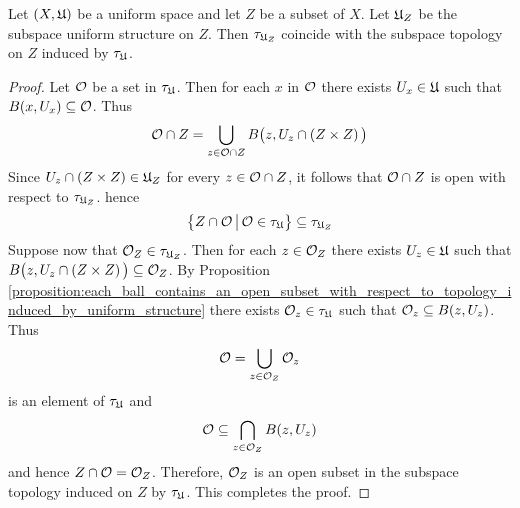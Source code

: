 \begin{proposition}\label{proposition:the_induced_topology_preserves_uniform_subspaces}
Let $(X,{\mathfrak U})$ be a uniform space and let $Z$ be a subset of $X$. Let ${\mathfrak U}_Z$ be the subspace uniform structure on $Z$. Then $\tau_{{\mathfrak U}_Z}$ coincide with the subspace topology on $Z$ induced by $\tau_{{\mathfrak U}}$.
\end{proposition}
\begin{proof}
Let ${\mathcal O}$ be a set in $\tau_{{\mathfrak U}}$. Then for each $x$ in ${\mathcal O}$ there exists $U_x\in {\mathfrak U}$ such that $B(x,U_x)\subseteq {\mathcal O}$. Thus
$${\mathcal O} \cap Z = \bigcup_{z\in {\mathcal O}\cap Z}B\big(z,U_z\cap \left(Z\times Z\right)\big)$$
Since $U_z\cap \left(Z\times Z\right) \in {\mathfrak U}_Z$ for every $z \in {\mathcal O}\cap Z$, it follows that ${\mathcal O}\cap Z$ is open with respect to $\tau_{{\mathfrak U}_Z}$. hence
$$\big\{Z\cap {\mathcal O}\,\big|\,{\mathcal O} \in \tau_{{\mathfrak U}}\big\} \subseteq \tau_{{\mathfrak U}_Z}$$
Suppose now that ${\mathcal O}_Z \in \tau_{{\mathfrak U}_Z}$. Then for each $z\in {\mathcal O}_Z$ there exists $U_z \in {\mathfrak U}$ such that $B\big(z,U_z\cap \left(Z\times Z\right)\big)\subseteq {\mathcal O}_Z$. By Proposition \ref{proposition:each_ball_contains_an_open_subset_with_respect_to_topology_induced_by_uniform_structure} there exists ${\mathcal O}_z \in \tau_{{\mathfrak U}}$ such that ${\mathcal O}_z\subseteq B(z,U_z)$. Thus 
$${\mathcal O} = \bigcup_{z \in {\mathcal O}_Z}{\mathcal O}_z$$
is an element of $\tau_{{\mathfrak U}}$ and
$${\mathcal O} \subseteq \bigcap_{z\in {\mathcal O}_Z}B(z,U_z)$$
and hence $Z\cap {\mathcal O} = {\mathcal O}_Z$. Therefore, ${\mathcal O}_Z$ is an open subset in the subspace topology induced on $Z$ by $\tau_{{\mathfrak U}}$. This completes the proof.
\end{proof}

